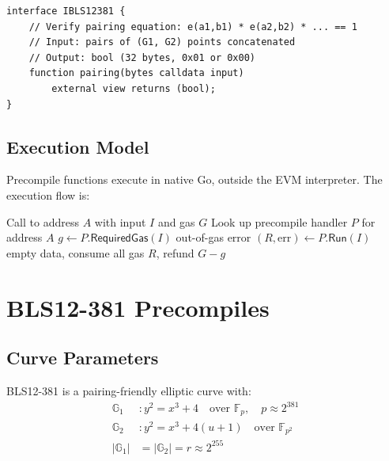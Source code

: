 \documentclass[11pt,a4paper]{article}
\begin{document}
\begin{lstlisting}[language=Solidity,caption={Solidity interface for BLS12-381 pairing precompile.},label={lst:interface}]
interface IBLS12381 {
    // Verify pairing equation: e(a1,b1) * e(a2,b2) * ... == 1
    // Input: pairs of (G1, G2) points concatenated
    // Output: bool (32 bytes, 0x01 or 0x00)
    function pairing(bytes calldata input)
        external view returns (bool);
}
\end{lstlisting}

\subsection{Execution Model}

Precompile functions execute in native Go, outside the EVM interpreter. The execution flow is:

\begin{algorithm}[H]
\caption{Precompile Dispatch}
\label{alg:dispatch}
\begin{algorithmic}[1]
\Require Call to address $A$ with input $I$ and gas $G$
\State Look up precompile handler $P$ for address $A$
\State $g \gets P.\mathsf{RequiredGas}(I)$ 
    \State \Return out-of-gas error
\EndIf
\State $(R, \text{err}) \gets P.\mathsf{Run}(I)$ 
    \State \Return empty data, consume all gas
\EndIf
\State \Return $R$, refund $G - g$
\end{algorithmic}
\end{algorithm}

\section{BLS12-381 Precompiles}\label{sec:bls12381}

\subsection{Curve Parameters}

BLS12-381 \cite{bowe2017bls12381} is a pairing-friendly elliptic curve with:
\begin{align}
    \mathbb{G}_1 &: y^2 = x^3 + 4 \quad \text{over } \mathbb{F}_p, \quad p \approx 2^{381} \\
    \mathbb{G}_2 &: y^2 = x^3 + 4(u + 1) \quad \text{over } \mathbb{F}_{p^2} \\
    |\mathbb{G}_1| &= |\mathbb{G}_2| = r \approx 2^{255}
\end{align}
\end{document}
